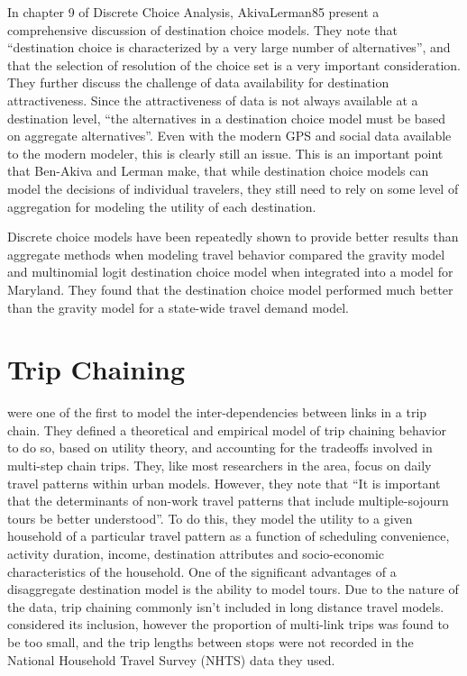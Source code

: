 In chapter 9 of Discrete Choice Analysis, {AkivaLerman85} present a comprehensive discussion of destination choice models. They note that \enquote{destination choice is characterized by a very large number of alternatives}, and that the selection of resolution of the choice set is a very important consideration. They further discuss the challenge of data availability for destination attractiveness. Since the attractiveness of data is not always available at a destination level, \enquote{the alternatives in a destination choice model must be based on aggregate alternatives}. Even with the modern GPS and social data available to the modern modeler, this is clearly still an issue. This is an important point that Ben-Akiva and Lerman make, that while destination choice models can model the decisions of individual travelers, they still need to rely on some level of aggregation for modeling the utility of each destination.

Discrete choice models have been repeatedly shown to provide better results than aggregate methods when modeling travel behavior \parencite*{Stephanedes84, Mishra13} compared the gravity model and multinomial logit destination choice model when integrated into a model for Maryland. They found that the destination choice model performed much better than the gravity model for a state-wide travel demand model. 

\section{Trip Chaining}
\textcite{AdlerAkiva79} were one of the first to model the inter-dependencies between links in a trip chain. They defined a theoretical and empirical model of trip chaining behavior to do so, based on utility theory, and accounting for the tradeoffs involved in multi-step chain trips. They, like most researchers in the area, focus on daily travel patterns within urban models. However, they note that \enquote{It is important that the determinants of non-work travel patterns that include multiple-sojourn tours be better understood}. To do this, they model the utility to a given household of a particular travel pattern as a function of scheduling convenience, activity duration, income, destination attributes and socio-economic characteristics of the household.
One of the significant advantages of a disaggregate destination model is the ability to model tours. Due to the nature of the data, trip chaining commonly isn't included in long distance travel models. \textcite{Moeckel15} considered its inclusion, however the proportion of multi-link trips was found to be too small, and the trip lengths between stops were not recorded in the National Household Travel Survey (NHTS) data they used. 

